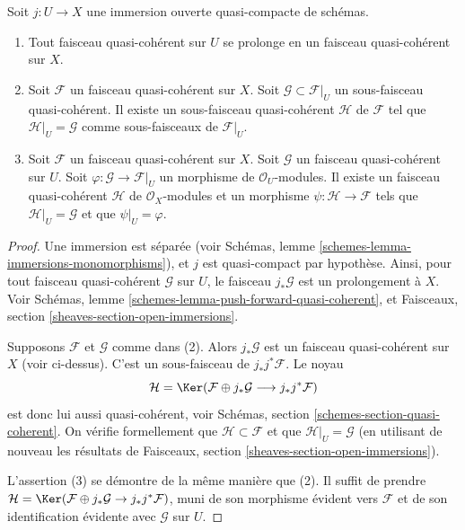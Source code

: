 \begin{lemma}
\label{lemma-extend-trivial}
Soit $j : U \to X$ une immersion ouverte quasi-compacte de schémas.
\begin{enumerate}
\item Tout faisceau quasi-cohérent sur $U$ se prolonge en un faisceau
quasi-cohérent sur $X$.
\item Soit $\mathcal{F}$ un faisceau quasi-cohérent sur $X$.
Soit $\mathcal{G} \subset \mathcal{F}|_U$ un sous-faisceau
quasi-cohérent. Il existe un sous-faisceau quasi-cohérent $\mathcal{H}$ de
$\mathcal{F}$ tel que $\mathcal{H}|_U = \mathcal{G}$
comme sous-faisceaux de $\mathcal{F}|_U$.
\item Soit $\mathcal{F}$ un faisceau quasi-cohérent sur $X$.
Soit $\mathcal{G}$ un faisceau quasi-cohérent sur $U$.
Soit $\varphi : \mathcal{G} \to \mathcal{F}|_U$ un morphisme
de $\mathcal{O}_U$-modules. Il existe un faisceau quasi-cohérent $\mathcal{H}$
de $\mathcal{O}_X$-modules et un morphisme $\psi : \mathcal{H} \to \mathcal{F}$
tels que $\mathcal{H}|_U = \mathcal{G}$ et que
$\psi|_U = \varphi$.
\end{enumerate}
\end{lemma}

\begin{proof}
Une immersion est séparée
(voir Schémas, lemme \ref{schemes-lemma-immersions-monomorphisms}),
et $j$ est quasi-compact par hypothèse.
Ainsi, pour tout faisceau quasi-cohérent $\mathcal{G}$ sur $U$, le faisceau
$j_*\mathcal{G}$ est un prolongement à $X$. Voir
Schémas, lemme \ref{schemes-lemma-push-forward-quasi-coherent}, et
Faisceaux, section \ref{sheaves-section-open-immersions}.

\medskip\noindent
Supposons $\mathcal{F}$ et $\mathcal{G}$ comme dans (2).
Alors $j_*\mathcal{G}$ est un faisceau quasi-cohérent sur $X$ (voir ci-dessus).
C'est un sous-faisceau de $j_*j^*\mathcal{F}$.
Le noyau
$$
\mathcal{H} =
\Ker(\mathcal{F} \oplus j_* \mathcal{G}
\longrightarrow j_*j^*\mathcal{F})
$$
est donc lui aussi quasi-cohérent, voir
Schémas, section \ref{schemes-section-quasi-coherent}.
On vérifie formellement que $\mathcal{H} \subset \mathcal{F}$ et que
$\mathcal{H}|_U = \mathcal{G}$ (en utilisant de nouveau les résultats de
Faisceaux, section \ref{sheaves-section-open-immersions}).

\medskip\noindent
L'assertion (3) se démontre de la même manière que (2). Il suffit de prendre
$\mathcal{H} = \Ker(\mathcal{F} \oplus j_* \mathcal{G}
\to j_*j^*\mathcal{F})$, muni de son morphisme évident vers $\mathcal{F}$
et de son identification évidente avec $\mathcal{G}$ sur $U$.
\end{proof}

